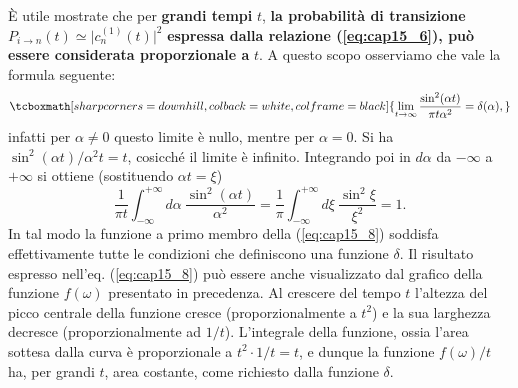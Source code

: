 È utile mostrate che per \textbf{grandi tempi} $t$, \textbf{la probabilità di transizione} $P_{i\rightarrow n} (t) \simeq \vert c_n ^{(1)} (t) \vert ^2$ \textbf{espressa dalla relazione (\ref{eq:cap15_6}), può essere considerata proporzionale a } $t$. A questo scopo osserviamo che vale la formula seguente:
	\begin{equation}
		\tcboxmath[sharp corners=downhill, colback=white, colframe=black]{
			\lim _{t \rightarrow \infty} \frac{\sin ^2 (\alpha t)}{\pi t \alpha ^2} = \delta (\alpha),
			}
	\label{eq:cap15_8}
	\end{equation}
infatti per $\alpha \neq 0$ questo limite è nullo, mentre per  $\alpha = 0$. Si ha $\sin ^2 (\alpha t)/\alpha ^2 t = t$, cosicché il limite è infinito. Integrando poi in $d \alpha$ da $-\infty$ a $+\infty$ si ottiene (sostituendo $\alpha t = \xi$)
	\begin{equation}
		\frac{1}{\pi t}\int _{-\infty} ^{+\infty} d\alpha \ \frac{\sin ^2 (\alpha t)}{ \alpha ^2} = \frac{1}{\pi}\int _{-\infty} ^{+\infty} d\xi \ \frac{\sin ^2 \xi}{ \xi ^2}=1. 
	\end{equation}
In tal modo la funzione a primo membro della (\ref{eq:cap15_8}) soddisfa effettivamente tutte le condizioni che definiscono una funzione $\delta$. Il risultato espresso nell'eq. (\ref{eq:cap15_8}) può essere anche visualizzato dal grafico della funzione $f(\omega)$ presentato in precedenza. Al crescere del tempo $t$ l'altezza del picco centrale della funzione cresce (proporzionalmente a $t^2$) e la sua larghezza decresce (proporzionalmente ad $1/t$). L'integrale della funzione, ossia l'area sottesa dalla curva è proporzionale a $t^2\cdot 1/t =t$, e dunque la funzione $f(\omega)/t$ ha, per grandi $t$, area costante, come richiesto dalla funzione $\delta$.\\


